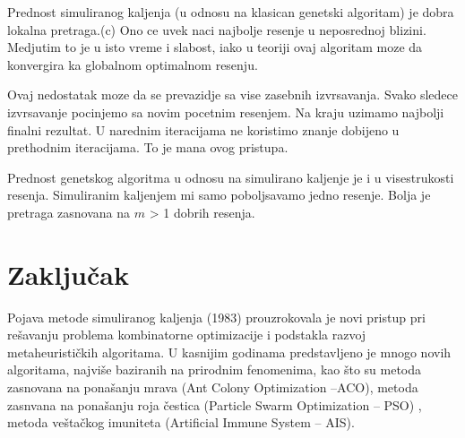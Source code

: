 \documentclass[a4paper]{article}
\begin{document}
Prednost simuliranog kaljenja (u odnosu na klasican genetski algoritam) je dobra lokalna pretraga.(c) Ono ce uvek naci najbolje resenje u neposrednoj blizini. Medjutim to je u isto vreme i slabost, iako u teoriji ovaj algoritam moze da konvergira ka globalnom optimalnom resenju. \par
Ovaj nedostatak moze da se prevazidje sa vise zasebnih izvrsavanja. Svako sledece izvrsavanje pocinjemo sa novim pocetnim resenjem. Na kraju uzimamo najbolji finalni rezultat. U narednim iteracijama ne koristimo znanje dobijeno u prethodnim iteracijama. To je mana ovog pristupa. \par
Prednost genetskog algoritma u odnosu na simulirano kaljenje je i u visestrukosti resenja. Simuliranim kaljenjem mi samo poboljsavamo jedno resenje. Bolja je pretraga zasnovana na $m$ > 1 dobrih resenja.





\section{Zaključak}
\label{sec:zakljucak}

Pojava metode simuliranog kaljenja (1983) prouzrokovala je novi pristup pri rešavanju
problema kombinatorne optimizacije i podstakla razvoj metaheurističkih algoritama. U kasnijim godinama predstavljeno je mnogo novih algoritama, najviše baziranih na prirodnim
fenomenima, kao što su metoda zasnovana na ponašanju mrava (Ant Colony Optimization –ACO), metoda zasnvana na ponašanju roja čestica (Particle Swarm Optimization –
PSO) , metoda veštačkog imuniteta (Artificial Immune System – AIS).


\appendix
 


\appendix
\end{document}
